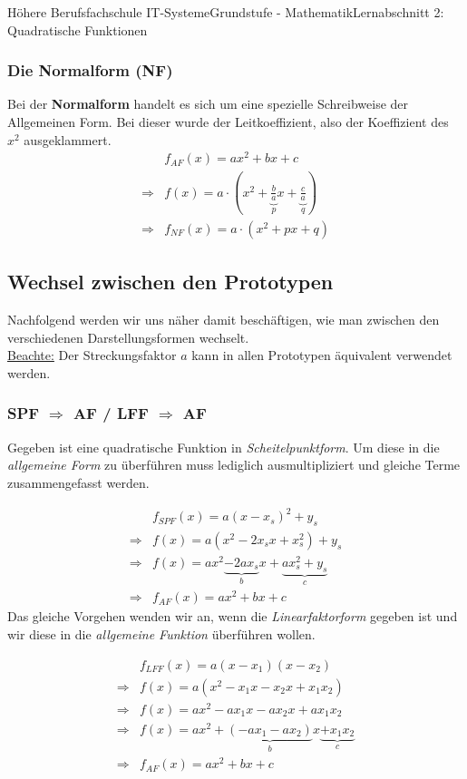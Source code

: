 \documentclass[11pt,twocolumn,oneside,openany,headings=optiontotoc,11pt,numbers=noenddot]{article}
\begin{document}
\begin{worksheet}{Höhere Berufsfachschule IT-Systeme}{Grundstufe - Mathematik}{Lernabschnitt 2: Quadratische Funktionen}
		\subsubsection*{Die Normalform (NF)}
		Bei der \textbf{Normalform} handelt es sich um eine spezielle Schreibweise der Allgemeinen Form. Bei dieser wurde der Leitkoeffizient, also der Koeffizient des \(x^2\) ausgeklammert.
		\begin{align*}
			& f_{AF}(x) = ax^2 +bx + c\\
			\Rightarrow & f(x) = a\cdot(x^2 + \underbrace{\frac{b}{a}}_{p}x + \underbrace{\frac{c}{a}}_{q})\\
			\Rightarrow & f_{NF}(x) = a\cdot(x^2 + px + q)
		\end{align*}
		\subsection{Wechsel zwischen den Prototypen}
		Nachfolgend werden wir uns näher damit beschäftigen, wie man zwischen den verschiedenen Darstellungsformen wechselt.\\
		\underline{Beachte:} Der Streckungsfaktor \(a\) kann in allen Prototypen äquivalent verwendet werden.
		\subsubsection*{SPF \(\Rightarrow\) AF / LFF \(\Rightarrow\) AF}
		Gegeben ist eine quadratische Funktion in \textit{Scheitelpunktform}. Um diese in die \textit{allgemeine Form} zu überführen muss lediglich ausmultipliziert und gleiche Terme zusammengefasst werden.\\
		\par\noindent
		\begin{align*}
			& f_{SPF}(x) = a(x-x_s)^2+y_s\\
			\Rightarrow & f(x) = a(x^2-2x_sx +x_s^2) + y_s\\
			\Rightarrow & f(x) = ax^2 \underbrace{-2ax_s}_{b}x + \underbrace{ax_s^2+y_s}_{c}\\
			\Rightarrow & f_{AF}(x) = ax^2+bx+c
		\end{align*}
		Das gleiche Vorgehen wenden wir an, wenn die \textit{Linearfaktorform} gegeben ist und wir diese in die \textit{allgemeine Funktion} überführen wollen.\\
		\par\noindent
		\begin{align*}
			& f_{LFF}(x) = a(x-x_1)(x-x_2)\\
			\Rightarrow & f(x) = a(x^2-x_1x - x_2x +x_1x_2)\\
			\Rightarrow & f(x) = ax^2-ax_1x - ax_2x +ax_1x_2\\
			\Rightarrow & f(x) = ax^2 + \underbrace{(-ax_1-ax_2)}_{b}x \underbrace{+x_1x_2}_{c}\\
			\Rightarrow & f_{AF}(x) = ax^2+bx+c
		\end{align*}

\end{worksheet}
\end{document}

